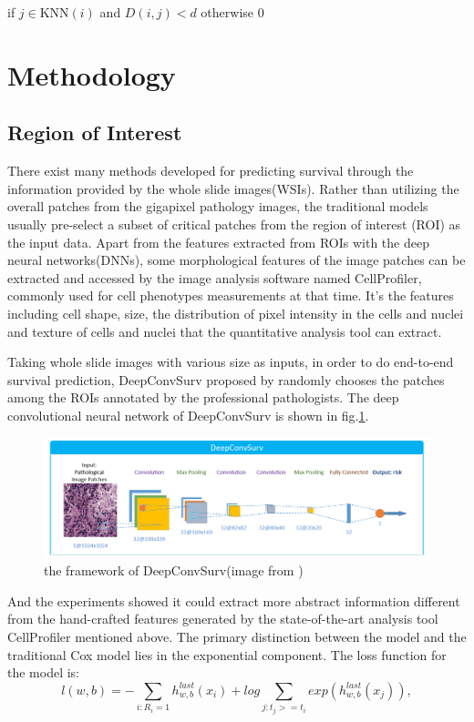 \documentclass[journal,twoside,web]{ieeecolor}
\begin{document}
if $j\in $KNN$( i) $ and $D(i,j)<d$  otherwise 0


\section{Methodology}
\subsection{Region of Interest}
There exist many methods developed for predicting survival through the information provided by the whole slide images(WSIs).
Rather than utilizing the overall patches from the gigapixel pathology images, the traditional models usually pre-select a subset of critical patches from the region of interest (ROI) as the input data.
Apart from the features extracted from ROIs with the deep neural networks(DNNs), some morphological features of the image patches can be extracted and accessed by the image analysis software named CellProfiler\cite{lamprecht2007cellprofiler}, commonly used for cell phenotypes measurements at that time.
It's the features including cell shape, size, the distribution of pixel intensity in the cells and nuclei and texture of cells and nuclei that the quantitative analysis tool can extract.

Taking whole slide images with various size as inputs, in order to do end-to-end survival prediction, DeepConvSurv proposed by \cite{zhu2016deep} randomly chooses the patches among the ROIs annotated by the professional pathologists.
The deep convolutional neural network of DeepConvSurv is shown in fig.\ref{DeepConvSurv}.
\begin{figure}
    \centering
    \includegraphics[width=0.8\linewidth]{img/deepconvsurv.png}
    \caption{the framework of DeepConvSurv(image from \cite{zhu2016deep})}
    \label{DeepConvSurv}
\end{figure}
And the experiments showed it could extract more abstract information different from the hand-crafted features generated by the state-of-the-art analysis tool CellProfiler mentioned above.
The primary distinction between the model and the traditional Cox model lies in the exponential component. The loss function for the model is:
\begin{equation}
l(w,b)=-\sum_{i:R_i=1}h_{w,b}^{last}(x_i)+log\sum_{j:t_j>=t_i}exp(h_{w,b}^{last}(x_j)),
\end{equation}
\end{document}

